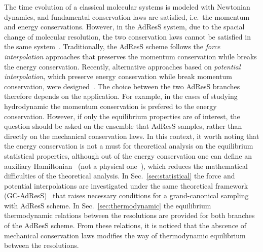 \documentclass[epjST]{svjour}
\begin{document}
The time evolution of a classical molecular systems
is modeled with Newtonian dynamics, and fundamental conservation laws
are satisfied, i.e.~the momentum and energy conservations.
However, in the AdResS system,
due to the spacial change of molecular resolution,
the two conservation laws cannot be satisfied in the same system~\cite{praprotnik2011comment,dellesite2007some}.
Traditionally, the AdResS scheme follows the \emph{force interpolation} approaches
that preserves the momentum conservation while breaks the energy
conservation.
Recently,
alternative approaches based on \emph{potential interpolation},
which preserve energy conservation while break momentum conservation,
were designed~\cite{wang2013grand,potestio2013hamiltonian}.
The choice between the two AdResS branches therefore depends on the application. For example, in the
cases of studying hydrodynamic the momentum conservation is prefered to the energy conservation.
However, if only the equilibrium properties are of interest,
the question should be asked on the ensemble that AdResS samples,
rather than directly on the mechanical conservation laws.
In this context,
it worth noting that the energy conservation is not a must for theoretical analysis on the equilibrium statistical properties,
although out of the energy conservation
one can define an auxiliary Hamiltonian~\cite{wang2013grand,agarwal2014chemical}
(not a physical one~\cite{dellesite2013multiscale}),
which reduces the mathematical difficulties of the theoretical analysis.
In Sec.~\ref{sec:statistical} the force and potential interpolations are investigated 
under the same theoretical framework (GC-AdResS)~\cite{wang2013grand} that raises necessary conditions
for a grand-canonical sampling with AdResS scheme.
In Sec.~\ref{sec:thermodynamic} the equilibrium thermodynamic relations between the resolutions are
provided for both branches of the AdResS scheme.
From these relations, it is noticed that the abscence of mechanical conservation laws 
modifies the way of thermodynamic equilibrium between the resolutions.
\end{document}
